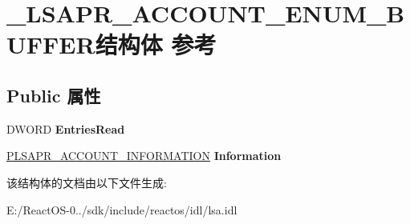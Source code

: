 \hypertarget{struct___l_s_a_p_r___a_c_c_o_u_n_t___e_n_u_m___b_u_f_f_e_r}{}\section{\+\_\+\+L\+S\+A\+P\+R\+\_\+\+A\+C\+C\+O\+U\+N\+T\+\_\+\+E\+N\+U\+M\+\_\+\+B\+U\+F\+F\+E\+R结构体 参考}
\label{struct___l_s_a_p_r___a_c_c_o_u_n_t___e_n_u_m___b_u_f_f_e_r}
\subsection*{Public 属性}
\begin{DoxyCompactItemize}
\item 
\mbox{\label{struct___l_s_a_p_r___a_c_c_o_u_n_t___e_n_u_m___b_u_f_f_e_r_a98b2c8bd9c90ad35dd91565a731ad111}} 
D\+W\+O\+RD {\bfseries Entries\+Read}
\item 
\mbox{\label{struct___l_s_a_p_r___a_c_c_o_u_n_t___e_n_u_m___b_u_f_f_e_r_afdffc3921290923355fc9b941738e435}} 
\hyperlink{struct___l_s_a_p_r___a_c_c_o_u_n_t___i_n_f_o_r_m_a_t_i_o_n}{P\+L\+S\+A\+P\+R\+\_\+\+A\+C\+C\+O\+U\+N\+T\+\_\+\+I\+N\+F\+O\+R\+M\+A\+T\+I\+ON} {\bfseries Information}
\end{DoxyCompactItemize}


该结构体的文档由以下文件生成\+:\begin{DoxyCompactItemize}
\item 
E\+:/\+React\+O\+S-\/0../sdk/include/reactos/idl/lsa.\+idl\end{DoxyCompactItemize}
